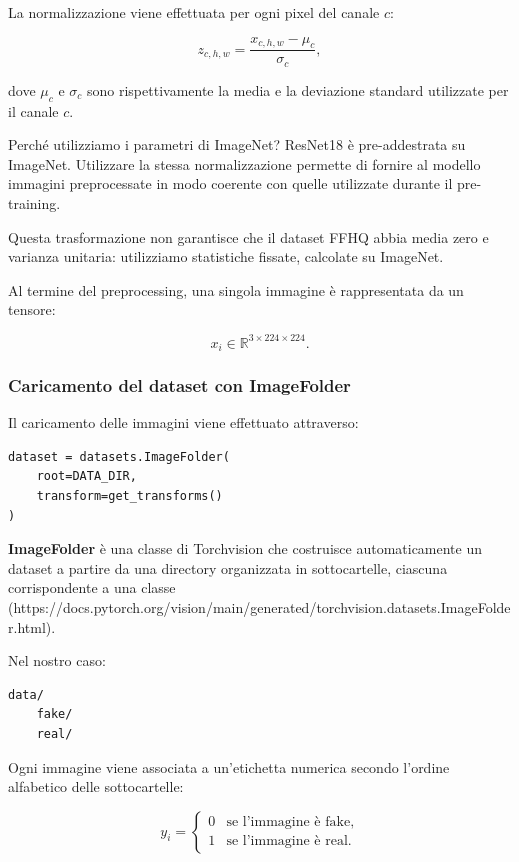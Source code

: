 \documentclass[10pt,a4paper,oneside]{book}
\begin{document}
La normalizzazione viene effettuata per ogni pixel del canale $c$:

\[
z_{c,h,w}
=
\frac{x_{c,h,w}-\mu_c}{\sigma_c},
\]

dove $\mu_c$ e $\sigma_c$ sono rispettivamente la media e la deviazione
standard utilizzate per il canale $c$.

\begin{importantbox}{Perché utilizziamo i parametri di ImageNet?}
ResNet18 è pre-addestrata su ImageNet. Utilizzare la stessa
normalizzazione permette di fornire al modello immagini preprocessate
in modo coerente con quelle utilizzate durante il pre-training.

Questa trasformazione non garantisce che il dataset FFHQ abbia media
zero e varianza unitaria: utilizziamo statistiche fissate, calcolate
su ImageNet.
\end{importantbox}

Al termine del preprocessing, una singola immagine è rappresentata
da un tensore:

\[
x_i \in \mathbb{R}^{3 \times 224 \times 224}.
\]

\subsubsection{Caricamento del dataset con ImageFolder}

Il caricamento delle immagini viene effettuato attraverso:

\begin{verbatim}
dataset = datasets.ImageFolder(
    root=DATA_DIR,
    transform=get_transforms()
)
\end{verbatim}

\textbf{ImageFolder} è una classe di Torchvision che costruisce
automaticamente un dataset a partire da una directory organizzata
in sottocartelle, ciascuna corrispondente a una classe (https://docs.pytorch.org/vision/main/generated/torchvision.datasets.ImageFolder.html). 


Nel nostro caso:

\begin{verbatim}
data/
    fake/
    real/
\end{verbatim}

Ogni immagine viene associata a un'etichetta numerica secondo
l'ordine alfabetico delle sottocartelle:

\[
y_i =
\begin{cases}
0 & \text{se l'immagine è fake},\\
1 & \text{se l'immagine è real}.
\end{cases}
\]
\end{document}
